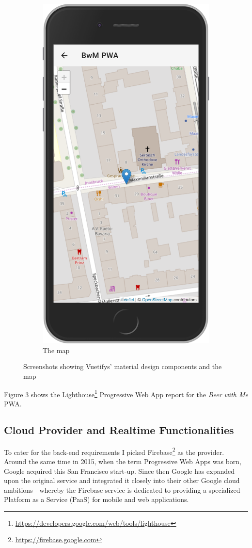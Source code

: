 \begin{figure}
\begin{subfigure}{.5\textwidth}
    \includegraphics[width=.7\linewidth]{img/screen03}
    \caption{The map}
    \label{fig:sub2}
  \end{subfigure}
  \caption{Screenshots showing Vuetifys' material design components and the map}
  \label{fig:test}
\end{figure}
\pagebreak

Figure 3 shows the Lighthouse\footnote{\url{https://developers.google.com/web/tools/lighthouse}} Progressive Web App report for the \textit{Beer with Me} PWA.


\subsection{Cloud Provider and Realtime Functionalities}

To cater for the back-end requirements I picked Firebase\footnote{\url{https://firebase.google.com}} as the provider. Around the same time in 2015, when the term Progressive Web Apps was born, Google acquired this San Francisco start-up. Since then Google has expanded upon the original service and integrated it closely into their other Google cloud ambitions - whereby the Firebase service is dedicated to providing a specialized Platform as a Service (PaaS) for mobile and web applications.


